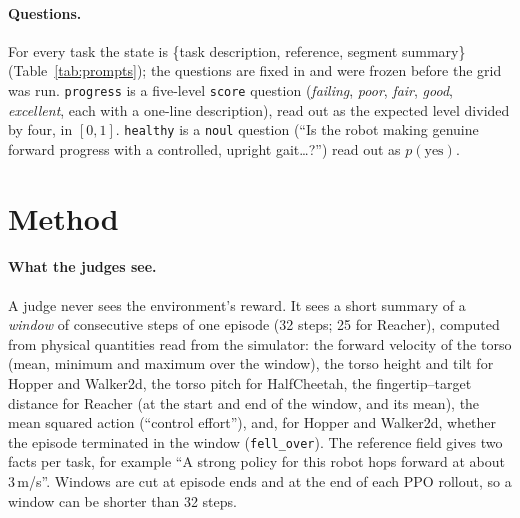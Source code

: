 \paragraph{Questions.} For every task the state is \{task description, reference, segment summary\}
(Table~\ref{tab:prompts}); the questions are fixed in  and
were frozen before the grid was run. \texttt{progress} is a five-level \texttt{score} question (\emph{failing},
\emph{poor}, \emph{fair}, \emph{good}, \emph{excellent}, each with a one-line description), read out as the expected
level divided by four, in $[0,1]$. \texttt{healthy} is a \texttt{noul} question (``Is the robot making genuine forward
progress with a controlled, upright gait\ldots?'') read out as $p(\text{yes})$.

\begin{table}[t]
\centering\footnotesize

\caption{The task text both judges read, per task. Each request also holds the window's summary (the quantities of
\S\ref{sec:method}). The \texttt{progress} question (``'') has five task-specific levels, from
\emph{failing} to \emph{excellent}; all are in .}
\label{tab:prompts}
\end{table}

\section{Method}\label{sec:method}

\paragraph{What the judges see.} A judge never sees the environment's reward. It sees a short summary of a
\emph{window} of consecutive steps of one episode (32 steps; 25 for Reacher), computed from physical quantities read
from the simulator: the forward velocity of the torso (mean, minimum and maximum over the window), the torso height and
tilt for Hopper and Walker2d, the torso pitch for HalfCheetah, the fingertip--target distance for Reacher (at the start
and end of the window, and its mean), the mean squared action (``control effort''), and, for Hopper and Walker2d,
whether the episode terminated in the window (\texttt{fell\_over}). The reference field gives two facts per task, for
example ``A strong policy for this robot hops forward at about 3\,m/s''. Windows are cut at episode ends and at the end
of each PPO rollout, so a window can be shorter than 32 steps.

